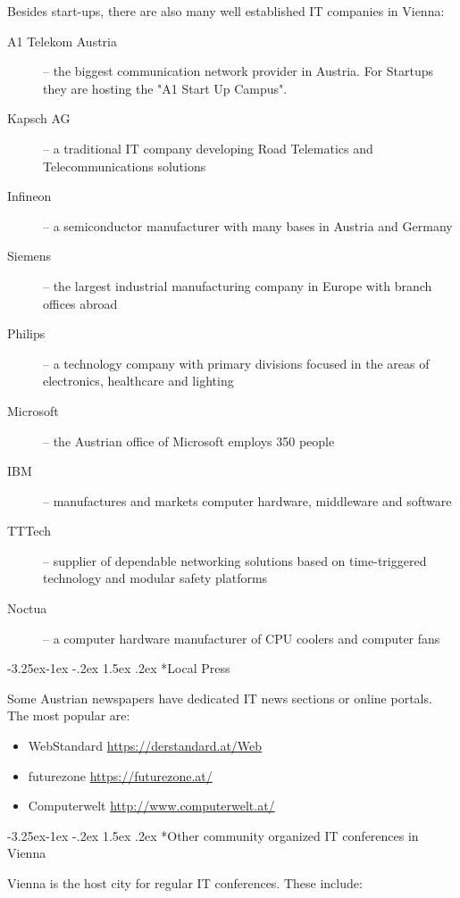 \documentclass[10pt,a4paper]{article}
\makeatletter
\renewcommand\subsection{%
\@startsection{subsection}{2}{\z@}%
              {-3.25ex\@plus -1ex \@minus -.2ex}%
              {1.5ex \@plus .2ex}%
              {\color{kdelight}\sffamily\Large\bfseries}}
\makeatother
\begin{document}
Besides start-ups, there are also many well established IT companies in Vienna:
\begin{description}
	\item[\color{kdedarker} A1 Telekom Austria] -- the biggest communication network provider in Austria. For Startups they are hosting the "A1 Start Up Campus".
	\item[\color{kdedarker} Kapsch AG] -- a traditional IT company developing Road Telematics and Telecommunications solutions
	\item[\color{kdedarker} Infineon] -- a semiconductor manufacturer with many bases in Austria and Germany
	\item[\color{kdedarker} Siemens] -- the largest industrial manufacturing company in Europe with branch offices abroad
	\item[\color{kdedarker} Philips] -- a technology company with primary divisions focused in the areas of electronics, healthcare and lighting
	\item[\color{kdedarker} Microsoft] -- the Austrian office of Microsoft employs 350 people
	\item[\color{kdedarker} IBM] -- manufactures and markets computer hardware, middleware and software
	\item[\color{kdedarker} TTTech] -- supplier of dependable networking solutions based on time-triggered technology and modular safety platforms
	\item[\color{kdedarker} Noctua] -- a computer hardware manufacturer of CPU coolers and computer fans
\end{description}

\subsection*{Local Press}
Some Austrian newspapers have dedicated IT news sections or online portals. The most popular are:

\begin{itemize}
\item WebStandard \url{https://derstandard.at/Web}
\item futurezone \url{https://futurezone.at/}
\item Computerwelt \url{http://www.computerwelt.at/}
\end{itemize}


\subsection*{Other community organized IT conferences in Vienna}
Vienna is the host city for regular IT conferences. These include:
\end{document}
